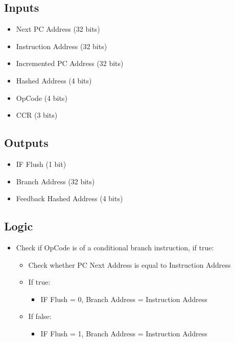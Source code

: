 \subsection{Inputs}
\begin{itemize}
    \item Next PC Address (32 bits)
    \item Instruction Address (32 bits)
    \item Incremented PC Address (32 bits)
    \item Hashed Address (4 bits)
    \item OpCode (4 bits)
    \item CCR (3 bits)
\end{itemize}

\subsection{Outputs}
\begin{itemize}
    \item IF Flush (1 bit)
    \item Branch Address (32 bits)
    \item Feedback Hashed Address (4 bits)
\end{itemize}

\subsection{Logic}
\begin{itemize}
    \item Check if OpCode is of a conditional branch instruction, if true:
    \begin{itemize}
        \item Check whether PC Next Address is equal to Instruction Address
        \item If true:
        \begin{itemize}
            \item IF Flush = 0, Branch Address = Instruction Address
        \end{itemize}
        \item If false:
        \begin{itemize}
            \item IF Flush = 1, Branch Address = Instruction Address
        \end{itemize}
    \end{itemize}
\end{itemize}

